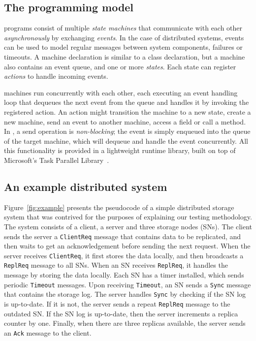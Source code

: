 \subsection{The \psharp programming model}
\label{sec:overview:psharp}

\psharp programs consist of multiple \emph{state machines} that communicate with each other \emph{asynchronously} by exchanging \emph{events}. In the case of distributed systems, \psharp events can be used to model regular messages between system components, failures or timeouts. A \psharp machine declaration is similar to a \csharp class declaration, but a machine also contains an event queue, and one or more \emph{states}. Each state can register \emph{actions} to handle incoming events.

\psharp machines run concurrently with each other, each executing an event handling loop that dequeues the next event from the queue and handles it by invoking the registered action. An action might transition the machine to a new state, create a new machine, send an event to another machine, access a field or call a method. In \psharp, a send operation is \emph{non-blocking}; the event is simply enqueued into the queue of the target machine, which will dequeue and handle the event concurrently. All this functionality is provided in a lightweight runtime library, built on top of Microsoft's Task Parallel Library~\cite{leijen2009tpl}.

\vspace{-2mm}
\subsection{An example distributed system}
\label{sec:overview:example}

Figure~\ref{fig:example} presents the pseudocode of a simple distributed storage system that was contrived for the purposes of explaining our testing methodology. The system consists of a client, a server and three storage nodes (SNs). The client sends the server a \texttt{ClientReq} message that contains data to be replicated, and then waits to get an acknowledgement before sending the next request. When the server receives \texttt{ClientReq}, it first stores the data locally, and then broadcasts a \texttt{ReplReq} message to all SNs. When an SN receives \texttt{ReplReq}, it handles the message by storing the data locally. Each SN has a timer installed, which sends periodic \texttt{Timeout} messages. Upon receiving \texttt{Timeout}, an SN sends a \texttt{Sync} message that contains the storage log. The server handles \texttt{Sync} by checking if the SN log is up-to-date. If it is not, the server sends a repeat \texttt{ReplReq} message to the outdated SN. If the SN log is up-to-date, then the server increments a replica counter by one. Finally, when there are three replicas available, the server sends an \texttt{Ack} message to the client.

